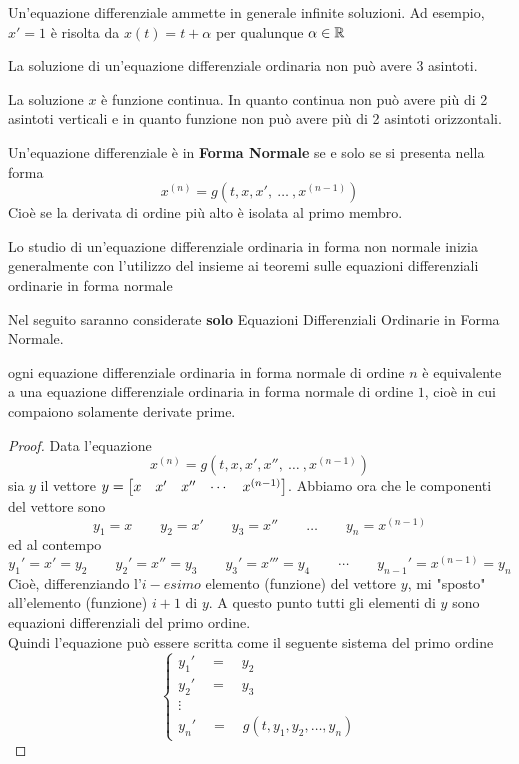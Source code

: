 \begin{example}
	\label{ex:eq_diff_inf_sol}
	Un'equazione differenziale ammette in generale infinite soluzioni. Ad esempio, $x' = 1$ è risolta da $x(t) = t + \alpha$ per qualunque $\alpha \in \mathbb{R}$
\end{example}
\begin{exercise}
	La soluzione di un'equazione differenziale ordinaria non può avere 3 asintoti.
	\begin{solution}
		La soluzione $x$ è funzione continua. In quanto continua non può avere più di 2 asintoti verticali e in quanto funzione non può avere più di 2 asintoti orizzontali.
	\end{solution}
\end{exercise}
\begin{definition}
	Un'equazione differenziale è in \textbf{Forma Normale} se e solo se si presenta nella forma 
	\[x^{(n)} = g(t,x, x',\:\dotsc\:,x^{(n-1)})\]
	Cioè se la derivata di ordine più alto è isolata al primo membro.
\end{definition}
\begin{observation}
	Lo studio di un'equazione differenziale ordinaria in forma non normale inizia generalmente con l'utilizzo del  insieme ai teoremi sulle equazioni differenziali ordinarie in forma normale
\end{observation}
\begin{note}
	Nel seguito saranno considerate \textbf{solo} Equazioni Differenziali Ordinarie in Forma Normale.
\end{note}
\begin{proposition}
	\label{prop:equaz_n_equival_1}
	ogni equazione differenziale ordinaria in forma normale di ordine $n$ è equivalente a una equazione differenziale ordinaria in forma normale di ordine $1$, cioè in cui compaiono solamente derivate prime.
	\begin{proof}
		Data l'equazione
		\[x^{(n)} = g(t,x, x', x'',\:\dotsc\:,x^{(n-1)})\]
		sia $y$ il vettore $y = \begin{bmatrix} x &  x' &  x'' & \cdots & x^{(n-1)} \end{bmatrix}$. Abbiamo ora che le componenti del vettore sono
		\[y_1=x\qquad y_2= x'\qquad y_3= x''\qquad \dots\qquad y_n=x^{(n-1)}\]
		ed al contempo
		\[y_1'= x'=y_2\qquad y_2'= x''=y_3\qquad y_3'= x'''=y_4\qquad\cdots\qquad y_{n-1}'=x^{(n-1)}=y_n\]
		Cioè, differenziando l'$i-esimo$ elemento (funzione) del vettore $y$, mi "sposto" all'elemento (funzione) $i+1$ di $y$. A questo punto tutti gli elementi di $y$ sono equazioni differenziali del primo ordine.\\
		Quindi l'equazione può essere scritta come il seguente sistema del primo ordine
		\[\begin{cases}
			y_1'\quad=\quad y_2\\
			y_2'\quad=\quad y_3\\
			\vdots\\
			y_n' \quad = \quad g(t, y_1, y_2,\dots,y_n)
		\end{cases}\]
	\end{proof}
\end{proposition}
